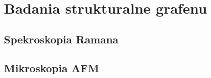 \chapter{Badania strukturalne grafenu}
	\section{Spekroskopia Ramana}
			\lipsum
	\section[AFM]{Mikroskopia AFM}
\lipsum
